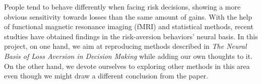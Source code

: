 
\par People tend to behave differently when facing risk decisions, showing a 
more obvious sensitivity towards losses than the same amount of gains. With the 
help of functional magnetic resonance imaging (fMRI) and statistical methods, 
recent studties have obtained findings in the risk-aversion behaviors' neural 
basis. In this project, on one hand, we aim at reproducing methods described in 
\textit{The Neural Basis of Loss Aversion in Decision Making} while adding our
own thoughts to it. On the other hand, we devote ourselves to exploring other 
methods in this area even though we might draw a different conclusion from the 
paper.
